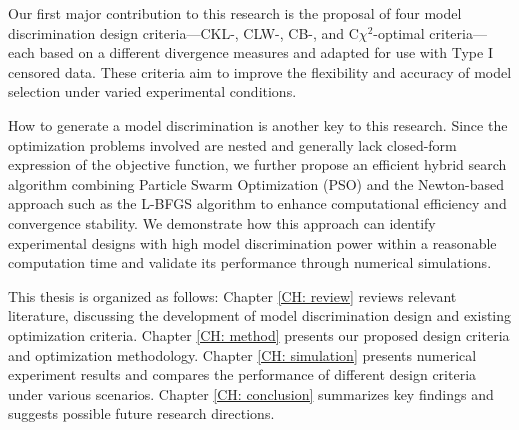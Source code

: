 \hspace*{8mm} Our first major contribution to this research is the proposal of four model discrimination design criteria—CKL-, CLW-, CB-, and C$\chi^2$-optimal criteria—each based on a different divergence measures and adapted for use with Type I censored data. These criteria aim to improve the flexibility and accuracy of model selection under varied experimental conditions.

\hspace*{8mm} How to generate a model discrimination is another key to this research. Since the optimization problems involved are nested and generally lack closed-form expression of the objective function, we further propose an efficient hybrid search algorithm combining Particle Swarm Optimization (PSO) and the Newton-based approach such as the L-BFGS algorithm  to enhance computational efficiency and convergence stability. We demonstrate how this approach can identify experimental designs with high model discrimination power within a reasonable computation time and validate its performance through numerical simulations.

\hspace*{8mm} This thesis is organized as follows: Chapter \ref{CH: review} reviews relevant literature, discussing the development of model discrimination design and existing optimization criteria. Chapter \ref{CH: method} presents our proposed design criteria and optimization methodology. Chapter \ref{CH: simulation} presents numerical experiment results and compares the performance of different design criteria under various scenarios. Chapter \ref{CH: conclusion} summarizes key findings and suggests possible future research directions.